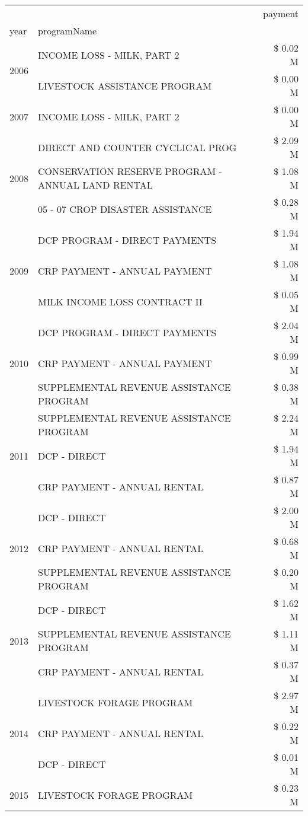 \begin{tabular}{llr}
\toprule
 &  & payment \\
year & programName &  \\
\midrule
\multirow[t]{2}{*}{2006} & INCOME LOSS - MILK, PART 2 & \$ 0.02 M \\
 & LIVESTOCK ASSISTANCE PROGRAM & \$ 0.00 M \\
\cline{1-3}
2007 & INCOME LOSS - MILK, PART 2 & \$ 0.00 M \\
\cline{1-3}
\multirow[t]{3}{*}{2008} & DIRECT AND COUNTER CYCLICAL PROG & \$ 2.09 M \\
 & CONSERVATION RESERVE PROGRAM - ANNUAL LAND RENTAL & \$ 1.08 M \\
 & 05 - 07 CROP DISASTER ASSISTANCE & \$ 0.28 M \\
\cline{1-3}
\multirow[t]{3}{*}{2009} & DCP PROGRAM - DIRECT PAYMENTS & \$ 1.94 M \\
 & CRP PAYMENT - ANNUAL PAYMENT & \$ 1.08 M \\
 & MILK INCOME LOSS CONTRACT II & \$ 0.05 M \\
\cline{1-3}
\multirow[t]{3}{*}{2010} & DCP PROGRAM - DIRECT PAYMENTS & \$ 2.04 M \\
 & CRP PAYMENT - ANNUAL PAYMENT & \$ 0.99 M \\
 & SUPPLEMENTAL REVENUE ASSISTANCE PROGRAM & \$ 0.38 M \\
\cline{1-3}
\multirow[t]{3}{*}{2011} & SUPPLEMENTAL REVENUE ASSISTANCE PROGRAM & \$ 2.24 M \\
 & DCP - DIRECT & \$ 1.94 M \\
 & CRP PAYMENT - ANNUAL RENTAL & \$ 0.87 M \\
\cline{1-3}
\multirow[t]{3}{*}{2012} & DCP - DIRECT & \$ 2.00 M \\
 & CRP PAYMENT - ANNUAL RENTAL & \$ 0.68 M \\
 & SUPPLEMENTAL REVENUE ASSISTANCE PROGRAM & \$ 0.20 M \\
\cline{1-3}
\multirow[t]{3}{*}{2013} & DCP - DIRECT & \$ 1.62 M \\
 & SUPPLEMENTAL REVENUE ASSISTANCE PROGRAM & \$ 1.11 M \\
 & CRP PAYMENT - ANNUAL RENTAL & \$ 0.37 M \\
\cline{1-3}
\multirow[t]{3}{*}{2014} & LIVESTOCK FORAGE PROGRAM & \$ 2.97 M \\
 & CRP PAYMENT - ANNUAL RENTAL & \$ 0.22 M \\
 & DCP - DIRECT & \$ 0.01 M \\
\cline{1-3}
\multirow[t]{3}{*}{2015} & LIVESTOCK FORAGE PROGRAM & \$ 0.23 M \\

\end{tabular}
